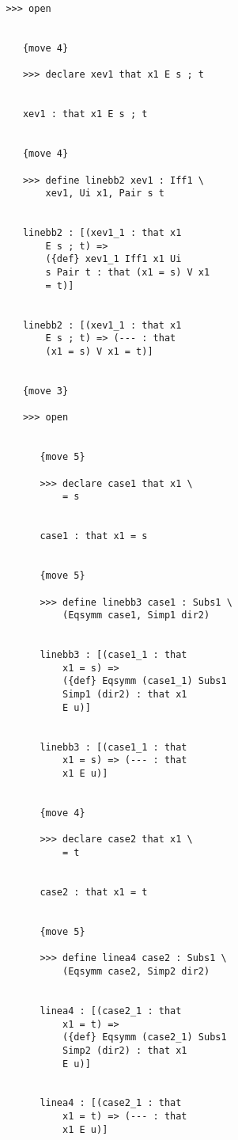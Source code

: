 \documentclass[12pt]{article}
\begin{document}
\begin{verbatim}
         >>> open


            {move 4}

            >>> declare xev1 that x1 E s ; t


            xev1 : that x1 E s ; t


            {move 4}

            >>> define linebb2 xev1 : Iff1 \
                xev1, Ui x1, Pair s t


            linebb2 : [(xev1_1 : that x1 
                E s ; t) => 
                ({def} xev1_1 Iff1 x1 Ui 
                s Pair t : that (x1 = s) V x1 
                = t)]


            linebb2 : [(xev1_1 : that x1 
                E s ; t) => (--- : that 
                (x1 = s) V x1 = t)]


            {move 3}

            >>> open


               {move 5}

               >>> declare case1 that x1 \
                   = s


               case1 : that x1 = s


               {move 5}

               >>> define linebb3 case1 : Subs1 \
                   (Eqsymm case1, Simp1 dir2)


               linebb3 : [(case1_1 : that 
                   x1 = s) => 
                   ({def} Eqsymm (case1_1) Subs1 
                   Simp1 (dir2) : that x1 
                   E u)]


               linebb3 : [(case1_1 : that 
                   x1 = s) => (--- : that 
                   x1 E u)]


               {move 4}

               >>> declare case2 that x1 \
                   = t


               case2 : that x1 = t


               {move 5}

               >>> define linea4 case2 : Subs1 \
                   (Eqsymm case2, Simp2 dir2)


               linea4 : [(case2_1 : that 
                   x1 = t) => 
                   ({def} Eqsymm (case2_1) Subs1 
                   Simp2 (dir2) : that x1 
                   E u)]


               linea4 : [(case2_1 : that 
                   x1 = t) => (--- : that 
                   x1 E u)]



\end{verbatim}
\end{document}
